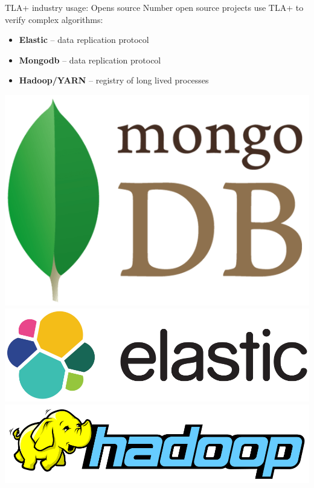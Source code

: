 \documentclass[12pt]{beamer}
\begin{document}
  \begin{frame}{TLA+ industry usage: Opens source}
      Number open source projects use TLA+ to verify complex algorithms:
    \begin{itemize}
        \item \textbf{Elastic} -- data replication protocol~\cite{elastic2017}
        \item \textbf{Mongodb} -- data replication protocol~\cite{mongo2016}
        \item \textbf{Hadoop/YARN} -- registry of long lived processes~\cite{hadoop2017}
    \end{itemize}
    \begin{center}
        \includegraphics[scale=0.1]{figures/mongo}
        \includegraphics[scale=0.12]{figures/elastic}
        \includegraphics[scale=0.14]{figures/hadoop}
    \end{center}
  \end{frame}
\end{document}

